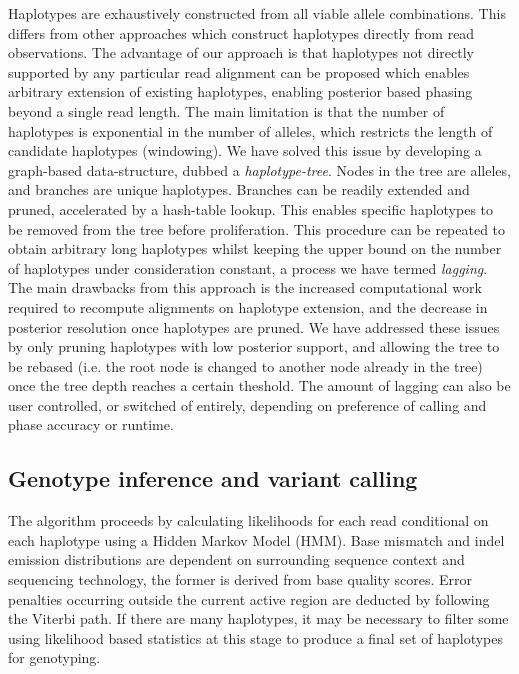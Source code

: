 \documentclass[notitlepage, twocolumn]{article}
\begin{document}
Haplotypes are exhaustively constructed from all viable allele combinations. This differs from other approaches which construct haplotypes directly from read observations. The advantage of our approach is that haplotypes not directly supported by any particular read alignment can be proposed which enables arbitrary extension of existing haplotypes, enabling posterior based phasing beyond a single read length. The main limitation is that the number of haplotypes is exponential in the number of alleles, which restricts the length of candidate haplotypes (windowing). We have solved this issue by developing a graph-based data-structure, dubbed a \emph{haplotype-tree}. Nodes in the tree are alleles, and branches are unique haplotypes. Branches can be readily extended and pruned, accelerated by a hash-table lookup. This enables specific haplotypes to be removed from the tree before proliferation. This procedure can be repeated to obtain arbitrary long haplotypes whilst keeping the upper bound on the number of haplotypes under consideration constant, a process we have termed \emph{lagging}. The main drawbacks from this approach is the increased computational work required to recompute alignments on haplotype extension, and the decrease in posterior resolution once haplotypes are pruned. We have addressed these issues by only pruning haplotypes with low posterior support, and allowing the tree to be rebased (i.e. the root node is changed to another node already in the tree) once the tree depth reaches a certain theshold. The amount of lagging can also be user controlled, or switched of entirely, depending on preference of calling and phase accuracy or runtime.

\subsection*{Genotype inference and variant calling}

The algorithm proceeds by calculating likelihoods for each read conditional on each haplotype using a Hidden Markov Model (HMM). Base mismatch and indel emission distributions are dependent on surrounding sequence context and sequencing technology, the former is derived from base quality scores. Error penalties occurring outside the current active region are deducted by following the Viterbi path. If there are many haplotypes, it may be necessary to filter some using likelihood based statistics at this stage to produce a final set of haplotypes for genotyping.
\end{document}
